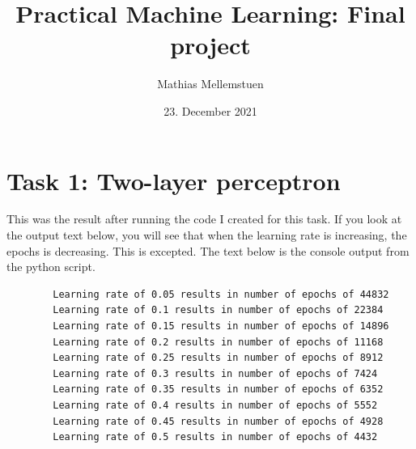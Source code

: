 \documentclass[titlepage, 11pt]{article}
\title{Practical Machine Learning: Final project }
\author{Mathias Mellemstuen}
\date{23. December 2021}
\begin{document}
    \maketitle

    \section{Task 1: Two-layer perceptron}
    This was the result after running the code I created for this task. If you look at the output text below, you will see that when the learning rate is increasing, the epochs is decreasing. This is excepted. \newline The text below is the console output from the python script.
    \begin{lstlisting}
        Learning rate of 0.05 results in number of epochs of 44832
        Learning rate of 0.1 results in number of epochs of 22384
        Learning rate of 0.15 results in number of epochs of 14896
        Learning rate of 0.2 results in number of epochs of 11168
        Learning rate of 0.25 results in number of epochs of 8912
        Learning rate of 0.3 results in number of epochs of 7424
        Learning rate of 0.35 results in number of epochs of 6352
        Learning rate of 0.4 results in number of epochs of 5552
        Learning rate of 0.45 results in number of epochs of 4928
        Learning rate of 0.5 results in number of epochs of 4432
    \end{lstlisting}
\end{document}
